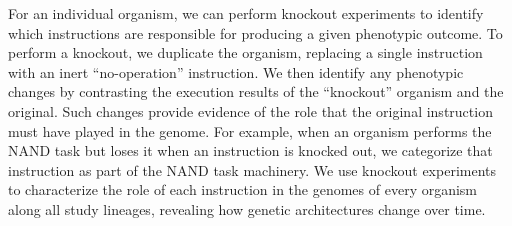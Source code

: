 

For an individual organism, we can perform knockout experiments to identify which instructions are responsible for producing a given phenotypic outcome.
To perform a knockout, we duplicate the organism, replacing a single instruction with an inert ``no-operation'' instruction.
We then identify any phenotypic changes by contrasting the execution results of the ``knockout'' organism and the original.
Such changes provide evidence of the role that the original instruction must have played in the genome.
For example, when an organism performs the NAND task but loses it when an instruction is knocked out, we categorize that instruction as part of the NAND task machinery.
We use knockout experiments to characterize the role of each instruction in the genomes of every organism along all study lineages, revealing how genetic architectures change over time.









